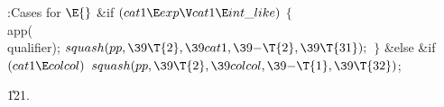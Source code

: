 \B{}:Cases for \X${}\E{}$\6
\&{if} ${}(\\{cat1}\E\\{exp}\V\\{cat1}\E\\{int\_like}){}$\5
${}\{{}$\1\6
\\{app}(\\{qualifier});\6
${}\\{squash}(\\{pp},\39\T{2},\39\\{cat1},\39{-}\T{2},\39\T{31});{}$\6
\4${}\}{}$\2\6
\&{else} \&{if} ${}(\\{cat1}\E\\{colcol}){}$\1\5
${}\\{squash}(\\{pp},\39\T{2},\39\\{colcol},\39{-}\T{1},\39\T{32}){}$;\2\par
\U121.\fi

